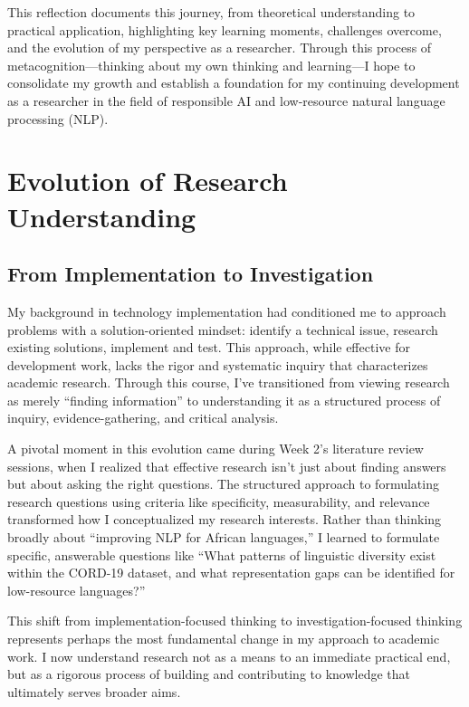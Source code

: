 \documentclass[
]{article}
\begin{document}
This reflection documents this journey, from theoretical understanding
to practical application, highlighting key learning moments, challenges
overcome, and the evolution of my perspective as a researcher. Through
this process of metacognition---thinking about my own thinking and
learning---I hope to consolidate my growth and establish a foundation
for my continuing development as a researcher in the field of
responsible AI and low-resource natural language processing (NLP).

\section{Evolution of Research
Understanding}\label{evolution-of-research-understanding}

\subsection{From Implementation to
Investigation}\label{from-implementation-to-investigation}

My background in technology implementation had conditioned me to
approach problems with a solution-oriented mindset: identify a technical
issue, research existing solutions, implement and test. This approach,
while effective for development work, lacks the rigor and systematic
inquiry that characterizes academic research. Through this course, I've
transitioned from viewing research as merely ``finding information'' to
understanding it as a structured process of inquiry, evidence-gathering,
and critical analysis.

A pivotal moment in this evolution came during Week 2's literature
review sessions, when I realized that effective research isn't just
about finding answers but about asking the right questions. The
structured approach to formulating research questions using criteria
like specificity, measurability, and relevance transformed how I
conceptualized my research interests. Rather than thinking broadly about
``improving NLP for African languages,'' I learned to formulate
specific, answerable questions like ``What patterns of linguistic
diversity exist within the CORD-19 dataset, and what representation gaps
can be identified for low-resource languages?''

This shift from implementation-focused thinking to investigation-focused
thinking represents perhaps the most fundamental change in my approach
to academic work. I now understand research not as a means to an
immediate practical end, but as a rigorous process of building and
contributing to knowledge that ultimately serves broader aims.
\end{document}
